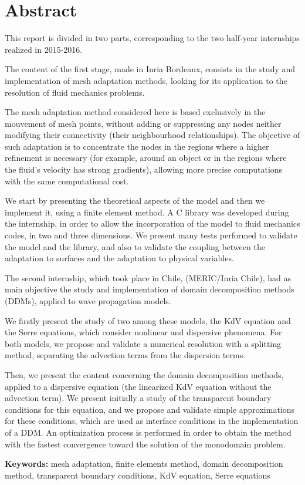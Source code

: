 \section*{Abstract}

\indent This report is divided in two parts, corresponding to the two half-year internships realized in 2015-2016.

\indent The content of the first stage, made in Inria Bordeaux, consists in the study and implementation of mesh adaptation methods, looking for its application to the resolution of fluid mechanics problems.

\indent The mesh adaptation method considered here is based exclusively in the mouvement of mesh points, without adding or suppressing any nodes neither modifying their connectivity (their neighbourhood relationships). The objective of such adaptation is to concentrate the nodes in the regions where a higher refinement is necessary (for example, around an object or in the regions where the fluid's velocity has strong gradients), allowing more precise computations with the same computational cost. 

\indent We start by presenting the theoretical aspects of the model and then we implement it, using a finite element method. A C library was developed during the internship, in order to allow the incorporation of the model to fluid mechanics codes, in two and three dimensions. We present many tests performed to validate the model and the library, and also to validate the coupling between the adaptation to surfaces and the adaptation to physical variables.

\indent The second internship, which took place in Chile, (MERIC/Inria Chile), had as main objective the study and implementation of domain decomposition methods (DDMs), applied to wave propagation models.

\indent We firstly present the study of two among these models, the KdV equation and the Serre equations, which consider nonlinear and dispersive phenomena. For both models, we propose and validate a numerical resolution with a splitting method, separating the advection terms from the dispersion terms.

\indent Then, we present the content concerning the domain decomposition methods, applied to a dispersive equation (the linearized KdV equation without the advection term). We present initially a study of the transparent boundary conditions for this equation, and we propose and validate simple approximations for these conditions, which are used as interface conditions in the implementation of a DDM. An optimization process is performed in order to obtain the method with the fastest convergence toward the solution of the monodomain problem.


\indent \textbf{Keywords:} mesh adaptation, finite elements method, domain decomposition method, transparent boundary conditions, KdV equation, Serre equations